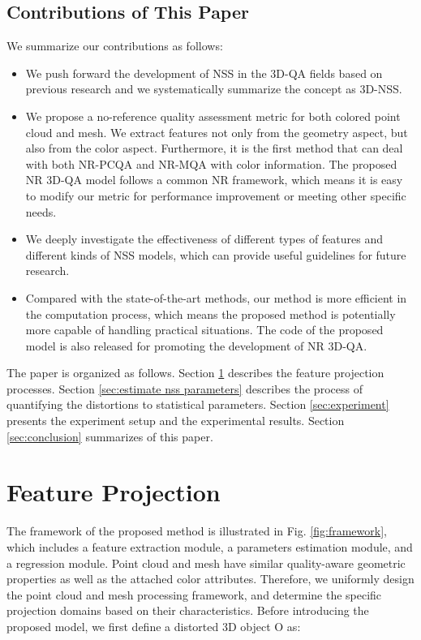 \documentclass[lettersize,journal]{IEEEtran}
\begin{document}
\subsection{Contributions of This Paper}
We summarize our contributions as follows:
\begin{itemize}
    \item {We push forward the development of NSS in the 3D-QA fields based on previous research \cite{lin2019blind,abouelaziz2018blind,nr-svr} and we systematically summarize the concept as 3D-NSS.} 
    \item We propose a no-reference quality assessment metric for both colored point cloud and mesh. We extract features not only from the geometry aspect, but also from the color aspect. Furthermore, it is the first method that can deal with both NR-PCQA and NR-MQA with color information. The proposed NR 3D-QA model follows a common NR framework, which means it is easy to modify our metric for performance improvement or meeting other specific needs.
    \item We deeply investigate the effectiveness of different types of features and different kinds of NSS models, which can provide useful guidelines for future research.
    \item Compared with the state-of-the-art methods, our method is more efficient in the computation process, which means the proposed method is potentially more capable of handling practical situations. The code of the proposed model is also released for promoting the development of NR 3D-QA.
\end{itemize}

The paper is organized as follows. Section \ref{sec:feature projection} describes the feature projection processes. Section \ref{sec:estimate nss parameters} describes the process of quantifying the distortions to statistical parameters. Section \ref{sec:experiment} presents the experiment setup and the experimental results. Section \ref{sec:conclusion} summarizes of this paper.






\section{Feature Projection}
\label{sec:feature projection}
The framework of the proposed method is illustrated in Fig. \ref{fig:framework}, which includes a feature extraction module, a parameters estimation module, and a regression module. Point cloud and mesh have similar quality-aware geometric properties as well as the attached color attributes. Therefore, we uniformly design the point cloud and mesh processing framework, and determine the specific projection domains based on their characteristics.
Before introducing the proposed model, we first define a distorted 3D object O as:
\end{document}
